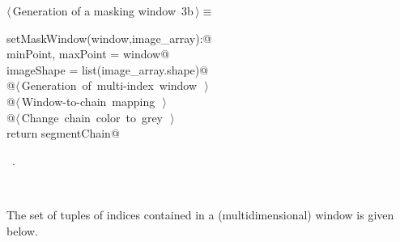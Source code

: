 \documentclass[11pt,oneside]{article}	%
\begin{document}
\begin{flushleft} \small
\begin{minipage}{\linewidth} \label{scrap4}
\protect{}$\langle\,$Generation of a masking window\nobreak\ {\footnotesize 3b}$\,\rangle\equiv$
\vspace{-1ex}
\begin{list}{}{} \item
\mbox{}\verb@def setMaskWindow(window,image_array):@\\
\mbox{}\verb@   minPoint, maxPoint = window@\\
\mbox{}\verb@   imageShape = list(image_array.shape)@\\
\mbox{}\verb@   @\hbox{$\langle\,$Generation of multi-index window\nobreak\ {\footnotesize {}}$\,\rangle$}\verb@@\\
\mbox{}\verb@   @\hbox{$\langle\,$Window-to-chain mapping\nobreak\ {\footnotesize {}}$\,\rangle$}\verb@@\\
\mbox{}\verb@   @\hbox{$\langle\,$Change chain color to grey\nobreak\ {\footnotesize {}}$\,\rangle$}\verb@@\\
\mbox{}\verb@   return segmentChain@\\
\mbox{}\verb@@{\NWsep}
\end{list}
\vspace{-1ex}
\footnotesize\addtolength{\baselineskip}{-1ex}
\begin{list}{}{\setlength{\itemsep}{-\parsep}\setlength{\itemindent}{-\leftmargin}}
\item \NWtxtMacroRefIn\ .
\end{list}
\end{minipage}\\[4ex]
\end{flushleft}

The set of tuples of indices contained in a (multidimensional) window is given below.
 
\end{document}
